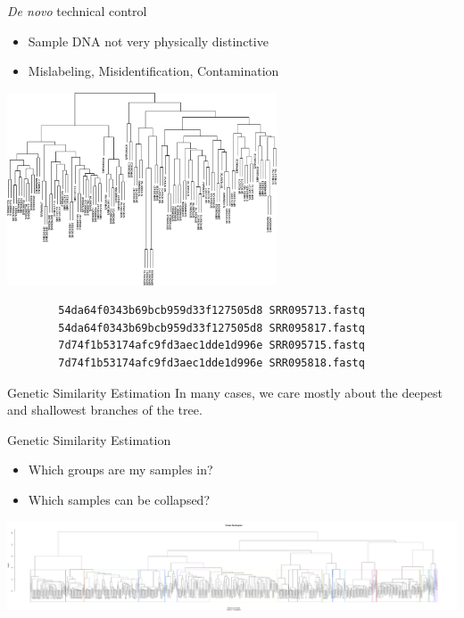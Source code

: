 \documentclass[t]{beamer}
\begin{document}
\begin{frame}[fragile]{\textit{De novo} technical control}
  \begin{itemize}
    \item Sample DNA not very physically distinctive
    \item Mislabeling, Misidentification, Contamination
  \end{itemize}
  \begin{center}
    \includegraphics[width=0.6\textwidth]{img/at80-tree.png}
  \end{center}
  \pause
  \begin{center}
    \begingroup
      \fontsize{7pt}{7pt}\selectfont
      \begin{verbatim}
        54da64f0343b69bcb959d33f127505d8 SRR095713.fastq
        54da64f0343b69bcb959d33f127505d8 SRR095817.fastq
        7d74f1b53174afc9fd3aec1dde1d996e SRR095715.fastq
        7d74f1b53174afc9fd3aec1dde1d996e SRR095818.fastq
      \end{verbatim}
    \endgroup
  \end{center}
\end{frame}

\begin{frame}[c]{Genetic Similarity Estimation}
  \centering In many cases, we care mostly about the deepest and shallowest
  branches of the tree.
\end{frame}

\begin{frame}{Genetic Similarity Estimation}
  \begin{itemize}
    \item Which groups are my samples in?
    \item Which samples can be collapsed?
  \end{itemize}
  \begin{center}
    \includegraphics[width=\textwidth]{img/jared-tree.pdf}
  \end{center}
\end{frame}
\end{document}
